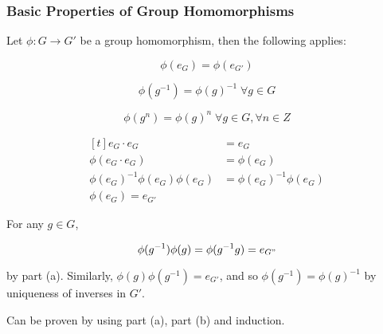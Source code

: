 \documentclass[a4paper,12pt]{article}
\begin{document}
\subsubsection{Basic Properties of Group Homomorphisms}
\begin{pst}
  Let $\phi:G\to G'$ be a group homomorphism, then the following applies:

  \begin{alist}
    \item

    $$\phi(e_{G})=\phi(e_{G'})$$

    \item

    $$\phi(g^{-1})=\phi(g)^{-1}\;\forall g\in G$$

    \item

    $$\phi(g^{n})=\phi(g)^{n}\;\forall g\in G,\forall n\in Z$$
  \end{alist}

  \prf {}

  $$\begin{aligned}[t]
    e_{G}\cdot e_{G}&=e_{G}\\
    \phi(e_{G}\cdot e_{G})&=\phi(e_{G})\\
    \phi(e_{G})^{-1}\phi(e_{G})\phi(e_{G})&=\phi(e_{G})^{-1}\phi(e_{G})\\
    \phi(e_{G})=e_{G'}
  \end{aligned}$$\s

   For any $g\in G$,

  $$\phi(g^{-1})\phi(g)=\phi(g^{-1}g)=e_{G"}$$\s

  by part (a). Similarly, $\phi(g)\phi(g^{-1})=e_{G'}$, and so $\phi(g^{-1})=\phi(g)^{-1}$ by uniqueness of inverses in $G'$.

   Can be proven by using part (a), part (b) and induction.
\end{pst}
\end{document}
